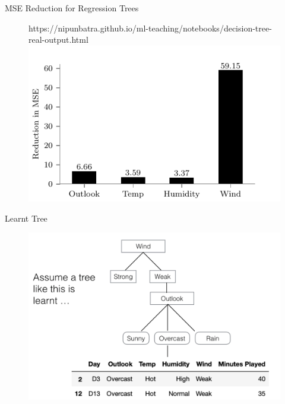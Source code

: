 \documentclass[usenames,dvipsnames]{beamer}
\begin{document}
\begin{frame}{MSE Reduction for Regression Trees}

	\begin{figure}[htp]
		\centering
		\begin{notebookbox}{https://nipunbatra.github.io/ml-teaching/notebooks/decision-tree-real-output.html}
		  \includegraphics[width=\linewidth]{../assets/decision-trees/figures/discrete-input-real-output-level-1.pdf}
		\end{notebookbox}
	  \end{figure}

\end{frame}

\begin{frame}{Learnt Tree}
\begin{figure}
	\centering
	\includegraphics[width=1\linewidth]{../assets/decision-trees/diagrams/tree}

	\label{fig:tree}
\end{figure}

\end{frame}
\end{document}
